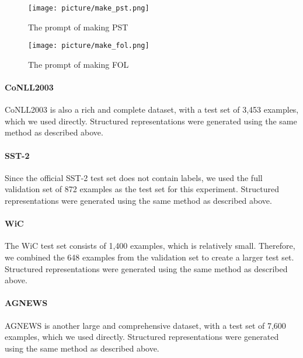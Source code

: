 \begin{figure}[ht]
\centering
\vspace{0in}
\texttt{[image: picture/make\_pst.png]}
\caption{The prompt of making PST}
\label{fig:makr_pst}
\vspace{-0.1in}
\end{figure}

\begin{figure}[ht]
\centering
\vspace{0in}
\texttt{[image: picture/make\_fol.png]}
\caption{The prompt of making FOL}
\label{fig:makr_fol}
\vspace{-0.1in}
\end{figure}

\paragraph{CoNLL2003}
CoNLL2003 is also a rich and complete dataset, with a test set of 3,453 examples, which we used directly. Structured representations were generated using the same method as described above.

\paragraph{SST-2}
Since the official SST-2 test set does not contain labels, we used the full validation set of 872 examples as the test set for this experiment. Structured representations were generated using the same method as described above.

\paragraph{WiC}
The WiC test set consists of 1,400 examples, which is relatively small. Therefore, we combined the 648 examples from the validation set to create a larger test set. Structured representations were generated using the same method as described above.

\paragraph{AGNEWS}
AGNEWS is another large and comprehensive dataset, with a test set of 7,600 examples, which we used directly. Structured representations were generated using the same method as described above.

